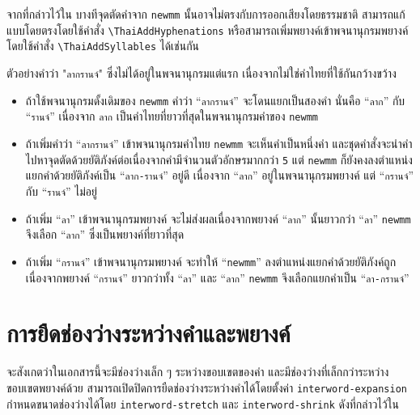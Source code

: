 จากที่กล่าวไว้ใน บางทีจุดตัดคำจาก \texttt{newmm}
นั้นอาจไม่ตรงกับการออกเสียงโดยธรรมชาติ สามารถแก้แบบโดยตรงโดยใช้คำสั่ง
\texttt{\textbackslash ThaiAddHyphenations}
หรือสามารถเพิ่มพยางค์เข้าพจนานุกรมพยางค์โดยใช้คำสั่ง
\texttt{\textbackslash ThaiAddSyllables} ได้เช่นกัน

ตัวอย่างคำว่า "\texttt{ลากรานจ์}" ซึ่งไม่ได้อยู่ในพจนานุกรมแต่แรก
เนื่องจากไม่ใช่คำไทยที่ใช้กันกว้างขว้าง

\begin{itemize}
  \item ถ้าใช้พจนานุกรมดั้งเดิมของ \texttt{newmm} คำว่า
        \enquote{\texttt{ลากรานจ์}} จะโดนแยกเป็นสองคำ นั่นคือ
        \enquote{\texttt{ลาก}} กับ \enquote{\texttt{รานจ์}} เนื่องจาก
        \texttt{ลาก} เป็นคำไทยที่ยาวที่สุดในพจนานุกรมคำของ
        \texttt{newmm}
  \item {} ถ้าเพิ่มคำว่า \enquote{\texttt{ลากรานจ์}}
        เข้าพจนานุกรมคำไทย \texttt{newmm} จะเห็นคำเป็นหนึ่งคำ
        และชุดคำสั่งจะนำคำไปหาจุดตัดด้วยยัติภังค์ต่อเนื่องจากคำมีจำนวนตัวอักษรมากกว่า
        \texttt{5} แต่ \texttt{newmm} ก็ยังคงลงตำแหน่งแยกคำด้วยยัติภังค์เป็น
        \enquote{\texttt{ลาก-รานจ์}} อยู่ดี เนื่องจาก \enquote{\texttt{ลาก}}
        อยู่ในพจนานุกรมพยางค์ แต่ \enquote{\texttt{กรานจ์}} กับ
        \enquote{\texttt{รานจ์}} ไม่อยู่
  \item ถ้าเพิ่ม \enquote{\texttt{ลา}} เข้าพจนานุกรมพยางค์
        จะไม่ส่งผลเนื่องจากพยางค์ \enquote{\texttt{ลาก}} นั้นยาวกว่า
        \enquote{\texttt{ลา}} \texttt{newmm} จึงเลือก \enquote{\texttt{ลาก}}
        ซึ่งเป็นพยางค์ที่ยาวที่สุด
  \item ถ้าเพิ่ม \enquote{\texttt{กรานจ์}} เข้าพจนานุกรมพยางค์ จะทำให้
        \enquote{\texttt{newmm}} ลงตำแหน่งแยกคำด้วยยัติภังค์ถูก เนื่องจากพยางค์
        \enquote{\texttt{กรานจ์}} ยาวกว่าทั้ง \enquote{\texttt{ลา}} และ
        \enquote{\texttt{ลาก}} \texttt{newmm} จึงเลือกแยกคำเป็น
        \enquote{\texttt{ลา-กรานจ์}}
\end{itemize}

\section{การยืดช่องว่างระหว่างคำและพยางค์}
\label{sec:interword-stretch}

จะสังเกตว่าในเอกสารนี้จะมีช่องว่างเล็ก ๆ ระหว่างขอบเขตของคำ
และมีช่องว่างที่เล็กกว่าระหว่างขอบเขตพยางค์ด้วย
สามารถเปิดปิดการยืดช่องว่างระหว่างคำได้โดยตั้งค่า \texttt{interword-expansion}
กำหนดขนาดช่องว่างได้โดย \texttt{interword-stretch} และ \texttt{interword-shrink}
ดังที่กล่าวไว้ใน

